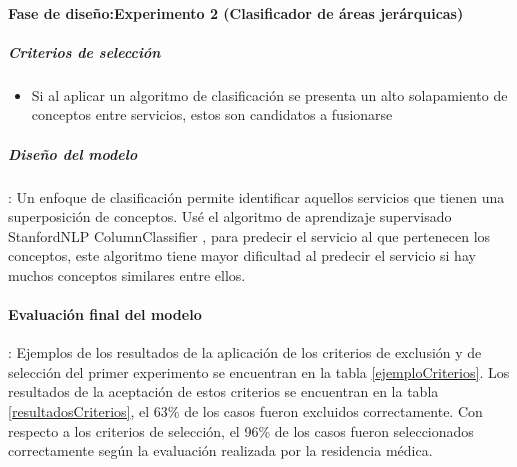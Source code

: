 \paragraph{Fase de diseño:Experimento 2 (Clasificador de áreas jerárquicas)}

\subparagraph{Criterios de selección}
\begin{itemize}
\item Si al aplicar un algoritmo de clasificación se presenta un alto solapamiento de conceptos entre servicios, estos son candidatos a fusionarse
\end{itemize}

\subparagraph{Diseño del modelo}: 
Un enfoque de clasificación permite identificar aquellos servicios que tienen una superposición de conceptos. Usé el algoritmo de aprendizaje supervisado StanfordNLP ColumnClassifier \cite{manning-EtAl:2014:P14-5},  para predecir el servicio al que pertenecen los conceptos, este algoritmo tiene mayor dificultad al predecir el servicio si hay muchos conceptos similares entre ellos.

\paragraph{Evaluación final del modelo}: Ejemplos de los resultados de la aplicación de los criterios de exclusión y de selección del primer experimento se encuentran en la tabla \ref{ejemploCriterios}. Los resultados de la aceptación de estos criterios se encuentran en la tabla \ref{resultadosCriterios}, el \num{63}\% de los casos fueron excluidos correctamente. Con respecto a los criterios de selección, el \num{96}\% de los casos fueron seleccionados correctamente según la evaluación realizada por la residencia médica.

